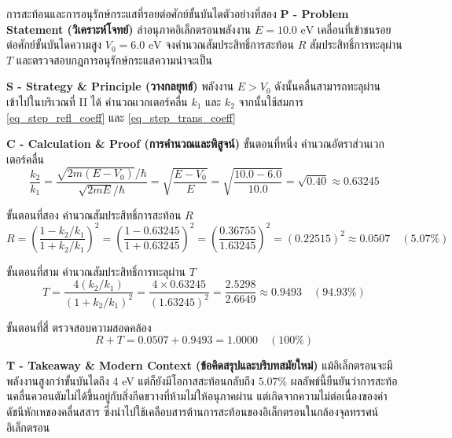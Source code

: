 \begin{psctbox}{การสะท้อนและการอนุรักษ์กระแสที่รอยต่อศักย์ขั้นบันได}{ตัวอย่างที่สอง}
\noindent\textbf{P - Problem Statement (วิเคราะห์โจทย์)} ลำอนุภาคอิเล็กตรอนพลังงาน $E = 10.0\text{ eV}$ เคลื่อนที่เข้าชนรอยต่อศักย์ขั้นบันไดความสูง $V_0 = 6.0\text{ eV}$ จงคำนวณสัมประสิทธิ์การสะท้อน $R$ สัมประสิทธิ์การทะลุผ่าน $T$ และตรวจสอบกฎการอนุรักษ์กระแสความน่าจะเป็น

\vspace{6pt}
\noindent\textbf{S - Strategy \& Principle (วางกลยุทธ์)} พลังงาน $E > V_0$ ดังนั้นคลื่นสามารถทะลุผ่านเข้าไปในบริเวณที่ II ได้ คำนวณเวกเตอร์คลื่น $k_1$ และ $k_2$ จากนั้นใช้สมการ \eqref{eq_step_refl_coeff} และ \eqref{eq_step_trans_coeff}

\vspace{6pt}
\noindent\textbf{C - Calculation \& Proof (การคำนวณและพิสูจน์)}
ขั้นตอนที่หนึ่ง คำนวณอัตราส่วนเวกเตอร์คลื่น
\begin{equation}
\frac{k_2}{k_1} = \frac{\sqrt{2m(E - V_0)}/\hbar}{\sqrt{2mE}/\hbar} = \sqrt{\frac{E - V_0}{E}} = \sqrt{\frac{10.0 - 6.0}{10.0}} = \sqrt{0.40} \approx 0.63245
\end{equation}

ขั้นตอนที่สอง คำนวณสัมประสิทธิ์การสะท้อน $R$
\begin{equation}
R = \left( \frac{1 - k_2/k_1}{1 + k_2/k_1} \right)^2 = \left( \frac{1 - 0.63245}{1 + 0.63245} \right)^2 = \left( \frac{0.36755}{1.63245} \right)^2 = (0.22515)^2 \approx 0.0507 \quad (5.07\%)
\end{equation}

ขั้นตอนที่สาม คำนวณสัมประสิทธิ์การทะลุผ่าน $T$
\begin{equation}
T = \frac{4(k_2/k_1)}{(1 + k_2/k_1)^2} = \frac{4 \times 0.63245}{(1.63245)^2} = \frac{2.5298}{2.6649} \approx 0.9493 \quad (94.93\%)
\end{equation}

ขั้นตอนที่สี่ ตรวจสอบความสอดคล้อง
\begin{equation}
R + T = 0.0507 + 0.9493 = 1.0000 \quad (100\%)
\end{equation}

\vspace{6pt}
\noindent\textbf{T - Takeaway \& Modern Context (ข้อคิดสรุปและบริบทสมัยใหม่)} แม้อิเล็กตรอนจะมีพลังงานสูงกว่าขั้นบันไดถึง 4 eV แต่ก็ยังมีโอกาสสะท้อนกลับถึง $5.07\%$ ผลลัพธ์นี้ยืนยันว่าการสะท้อนคลื่นควอนตัมไม่ได้ขึ้นอยู่กับสิ่งกีดขวางที่ห้ามไม่ให้อนุภาคผ่าน แต่เกิดจากความไม่ต่อเนื่องของค่าดัชนีหักเหของคลื่นสสาร ซึ่งนำไปใช้เคลือบสารต้านการสะท้อนของอิเล็กตรอนในกล้องจุลทรรศน์อิเล็กตรอน
\end{psctbox}

